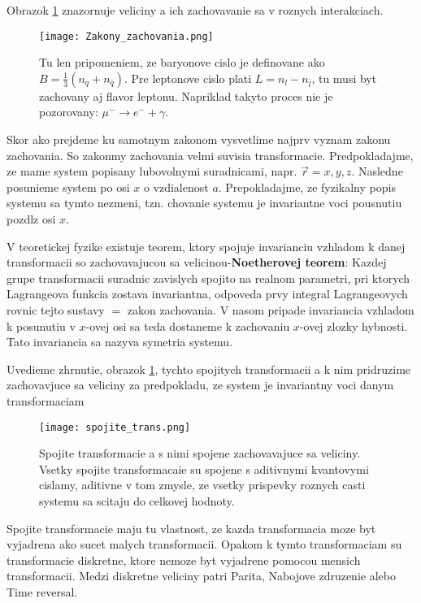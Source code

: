 \documentclass[../../main.tex]{subfiles}
\begin{document}
Obrazok \ref{sf1:fig:zzachovania} znazornuje veliciny a ich zachovavanie sa v roznych interakciach. 
\begin{figure}[!h]
\centering
\texttt{[image: Zakony\_zachovania.png]}
\caption{Tu len pripomeniem, ze baryonove cislo je definovane ako $B=\frac{1}{3}(n_q+n_{\bar{q}})$. Pre leptonove cislo plati $L=n_l-n_{\bar{l}}$, tu musi byt zachovany aj flavor leptonu. Napriklad takyto proces nie je pozorovany: $\mu^- \rightarrow e^-+\gamma$.}
\label{sf1:fig:zzachovania}
\end{figure}
\newline
Skor ako prejdeme ku samotnym zakonom vysvetlime najprv vyznam zakonu zachovania. So zakonmy zachovania velmi suvisia transformacie. Predpokladajme, ze mame system popisany lubovolnymi suradnicami, napr. $\vec{r}=x,y,z.$ Nasledne posunieme system po osi $x$ o vzdialenost $a$. Prepokladajme, ze fyzikalny popis systemu sa tymto nezmeni, tzn. chovanie systemu je invariantne voci pousnutiu pozdlz osi $x$.\par
V teoretickej fyzike existuje teorem, ktory spojuje invarianciu vzhladom k danej transformacii so zachovavajucou sa velicinou-\textbf{Noetherovej teorem}: Kazdej grupe transformacii suradnic zavislych spojito na realnom parametri, pri ktorych Lagrangeova funkcia zostava invariantna, odpoveda prvy integral Lagrangeovych rovnic tejto sustavy $=$ zakon zachovania. V nasom pripade invariancia vzhladom k posunutiu v $x$-ovej osi sa teda dostaneme k zachovaniu $x$-ovej zlozky hybnosti. Tato invariancia sa nazyva symetria systemu.\par 
Uvedieme zhrnutie, obrazok \ref{sf1:fig:zzachovania}, tychto spojitych transformacii a k nim pridruzime zachovavjuce sa veliciny za predpokladu, ze system je invariantny voci danym transformaciam
\begin{figure}[!h]
\centering
\texttt{[image: spojite\_trans.png]}
\caption{Spojite transformacie a s nimi spojene zachovavajuce sa veliciny. Vsetky spojite transformacaie su spojene s aditivnymi kvantovymi cislamy, aditivne v tom zmysle, ze vsetky prispevky roznych casti systemu sa scitaju do celkovej hodnoty.}
\label{sf1:fig:spojtran}
\end{figure}
\newline
Spojite transformacie maju tu vlastnost, ze kazda transformacia moze byt vyjadrena ako sucet malych transformacii. Opakom k tymto transformaciam su transformacie diskretne, ktore nemoze byt vyjadrene pomocou mensich transformacii. Medzi diskretne veliciny patri Parita, Nabojove zdruzenie alebo Time reversal.\newline
\end{document}
